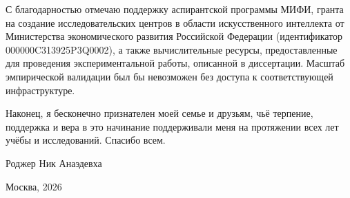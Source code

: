 С благодарностью отмечаю поддержку аспирантской программы МИФИ, гранта на создание исследовательских центров в области искусственного интеллекта от Министерства экономического развития Российской Федерации (идентификатор 000000C313925P3Q0002), а также вычислительные ресурсы, предоставленные для проведения экспериментальной работы, описанной в диссертации. Масштаб эмпирической валидации был бы невозможен без доступа к соответствующей инфраструктуре.

Наконец, я бесконечно признателен моей семье и друзьям, чьё терпение, поддержка и вера в это начинание поддерживали меня на протяжении всех лет учёбы и исследований. Спасибо всем.

\hfill Роджер Ник Анаэдевха

\hfill Москва, 2026 

